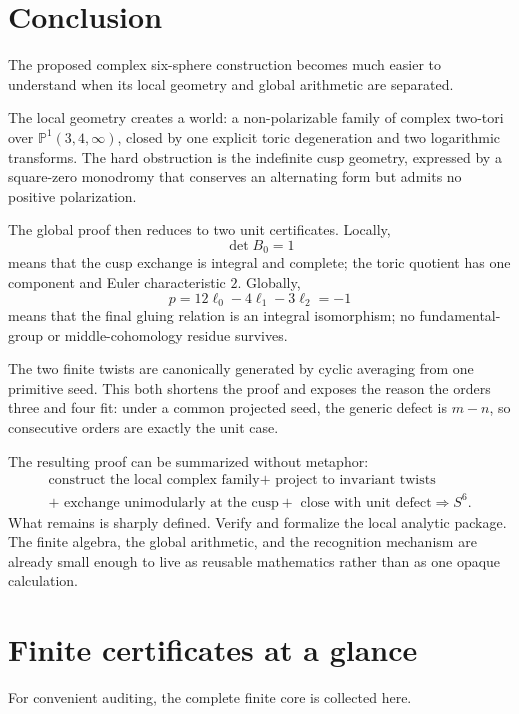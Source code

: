\documentclass[11pt,reqno]{amsart}
\numberwithin{equation}{section}
\newcommand{\Pone}{\mathbb P^1}
\theoremstyle{definition}
\begin{document}
\section{Conclusion}\label{sec:conclusion}

The proposed complex six-sphere construction becomes much easier to understand when its local geometry and global arithmetic are separated.

The local geometry creates a world: a non-polarizable family of complex two-tori over $\Pone(3,4,\infty)$, closed by one explicit toric degeneration and two logarithmic transforms. The hard obstruction is the indefinite cusp geometry, expressed by a square-zero monodromy that conserves an alternating form but admits no positive polarization.

The global proof then reduces to two unit certificates. Locally,
\[
\det B_0=1
\]
means that the cusp exchange is integral and complete; the toric quotient has one component and Euler characteristic $2$. Globally,
\[
p=12\ell_0-4\ell_1-3\ell_2=-1
\]
means that the final gluing relation is an integral isomorphism; no fundamental-group or middle-cohomology residue survives.

The two finite twists are canonically generated by cyclic averaging from one primitive seed. This both shortens the proof and exposes the reason the orders three and four fit: under a common projected seed, the generic defect is $m-n$, so consecutive orders are exactly the unit case.

The resulting proof can be summarized without metaphor:
\[
\boxed{
\begin{gathered}
\text{construct the local complex family}
+\text{ project to invariant twists}
\\
+\text{ exchange unimodularly at the cusp}
+\text{ close with unit defect}
\Longrightarrow S^6.
\end{gathered}
}
\]
What remains is sharply defined. Verify and formalize the local analytic package. The finite algebra, the global arithmetic, and the recognition mechanism are already small enough to live as reusable mathematics rather than as one opaque calculation.

\appendix

\section{Finite certificates at a glance}\label{app:certificates}

For convenient auditing, the complete finite core is collected here.
\end{document}
